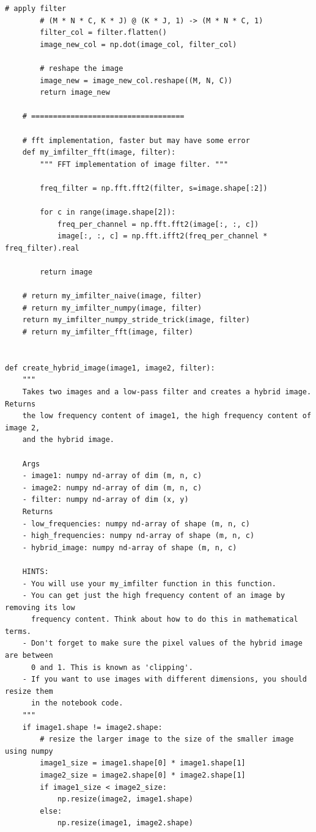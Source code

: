 \begin{lstlisting}[style=Python]
        # apply filter
        # (M * N * C, K * J) @ (K * J, 1) -> (M * N * C, 1)
        filter_col = filter.flatten()
        image_new_col = np.dot(image_col, filter_col)
        
        # reshape the image
        image_new = image_new_col.reshape((M, N, C))
        return image_new

    # ===================================
    
    # fft implementation, faster but may have some error
    def my_imfilter_fft(image, filter):
        """ FFT implementation of image filter. """

        freq_filter = np.fft.fft2(filter, s=image.shape[:2])

        for c in range(image.shape[2]):
            freq_per_channel = np.fft.fft2(image[:, :, c])
            image[:, :, c] = np.fft.ifft2(freq_per_channel * freq_filter).real
    
        return image
    
    # return my_imfilter_naive(image, filter)
    # return my_imfilter_numpy(image, filter)
    return my_imfilter_numpy_stride_trick(image, filter)
    # return my_imfilter_fft(image, filter)


def create_hybrid_image(image1, image2, filter):
    """
    Takes two images and a low-pass filter and creates a hybrid image. Returns
    the low frequency content of image1, the high frequency content of image 2,
    and the hybrid image.

    Args
    - image1: numpy nd-array of dim (m, n, c)
    - image2: numpy nd-array of dim (m, n, c)
    - filter: numpy nd-array of dim (x, y)
    Returns
    - low_frequencies: numpy nd-array of shape (m, n, c)
    - high_frequencies: numpy nd-array of shape (m, n, c)
    - hybrid_image: numpy nd-array of shape (m, n, c)

    HINTS:
    - You will use your my_imfilter function in this function.
    - You can get just the high frequency content of an image by removing its low
      frequency content. Think about how to do this in mathematical terms.
    - Don't forget to make sure the pixel values of the hybrid image are between
      0 and 1. This is known as 'clipping'.
    - If you want to use images with different dimensions, you should resize them
      in the notebook code.
    """
    if image1.shape != image2.shape:
        # resize the larger image to the size of the smaller image using numpy
        image1_size = image1.shape[0] * image1.shape[1]
        image2_size = image2.shape[0] * image2.shape[1]
        if image1_size < image2_size:
            np.resize(image2, image1.shape)
        else:
            np.resize(image1, image2.shape)
    

\end{lstlisting}
